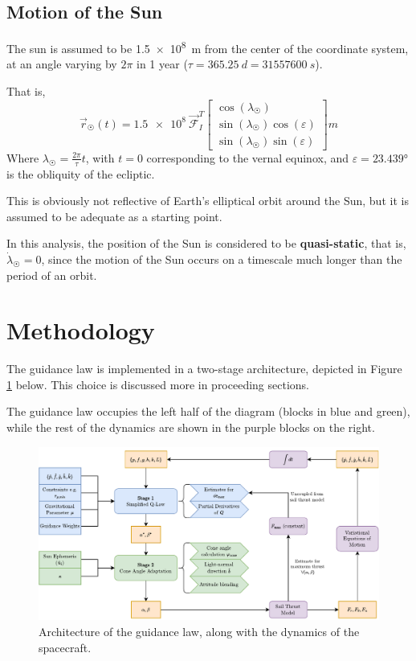 \subsection{Motion of the Sun}
The sun is assumed to be \qty{1.5e8}{m} from the center of the coordinate system, at an angle varying by \(2\pi\) in 1 year (\(\tau = \qty{365.25}{d} = \qty{31557600}{s}\)).

That is,
\begin{equation}
    \vec{r}_{\astrosun}(t) =
    \num{1.5e8}
    \
    \mathcal{\vec{F}}_I^T
    \begin{bmatrix}
        \cos(\lambda_{\astrosun})                   \\
        \sin(\lambda_{\astrosun}) \cos(\varepsilon) \\
        \sin(\lambda_{\astrosun}) \sin(\varepsilon)
    \end{bmatrix}
    \unit{m}
    \label{eq:sun_position_3d}
\end{equation}
Where \(\lambda_{\astrosun} = \frac{2 \pi}{\tau} t\), with \(t=0\) corresponding to the vernal equinox, and \(\varepsilon = \ang{23.439}\) is the obliquity of the ecliptic.

This is obviously not reflective of Earth's elliptical orbit around the Sun, but it is assumed to be adequate as a starting point.

In this analysis, the position of the Sun is considered to be \textbf{quasi-static}, that is, \(\dot{\lambda}_{\astrosun} = 0\), since the motion of the Sun occurs on a timescale much longer than the period of an orbit.

\section{Methodology}
The guidance law is implemented in a two-stage architecture, depicted in Figure \ref{fig:algorithm_diagram} below. This choice is discussed more in proceeding sections.

The guidance law occupies the left half of the diagram (blocks in blue and green), while the rest of the dynamics are shown in the purple blocks on the right.

\begin{figure}[H]
    \centering
    \includegraphics[width=\textwidth]{figures/compute_topology.drawio.pdf}
    \caption{Architecture of the guidance law, along with the dynamics of the spacecraft.}
    \label{fig:algorithm_diagram}
\end{figure}

